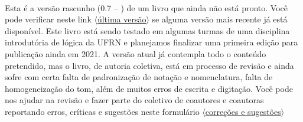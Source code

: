 \thispagestyle{empty}
\onecolumn
\ 
\vfill

\parbox{3 in}{
Esta é a versão rascunho (0.7 -- \mydate) de um livro que ainda não está pronto.
Você pode verificar neste link
\href{https://github.com/Grupo-de-Estudos-em-Logica-da-UFRN/Para-Todxs-Natal/blob/main/paratodxsnatal.pdf}{$\langle$última versão$\rangle$}
se alguma versão mais recente já está disponível.
Este livro está sendo testado em algumas turmas de uma disciplina introdutória de lógica da UFRN e planejamos finalizar uma primeira edição para publicação ainda em 2021. 
A versão atual já contempla todo o conteúdo pretendido, mas o livro, de autoria coletiva, está em processo de revisão e ainda sofre com certa falta de padronização de notação e nomenclatura, falta de homogeneização do tom, além de muitos erros de escrita e digitação.
Você pode nos ajudar na revisão e fazer parte do coletivo de coautores e coautoras reportando erros, críticas e sugestões neste formulário
\href{https://forms.gle/yd4yH9WAo6TxAiSj8}{$\langle$correções e sugestões$\rangle$}
}

\vfill

\parbox{3 in}{

}
\vfill
